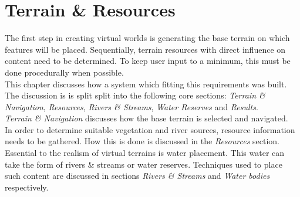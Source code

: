 \chapter{Terrain \& Resources}

The first step in creating virtual worlds is generating the base terrain on which features will be placed. Sequentially, terrain resources with direct influence on content need to be determined. To keep user input to a minimum, this must be done procedurally when possible. \\
This chapter discusses how a system which fitting this requirements was built. The discussion is is split split into the following core sections: \textit{Terrain \& Navigation}, \textit{Resources}, \textit{Rivers \& Streams}, \textit{Water Reserves} and \textit{Results}.\\
\textit{Terrain \& Navigation} discusses how the base terrain is selected and navigated. \\
In order to determine suitable vegetation and river sources, resource information needs to be gathered. How this is done is discussed in the \textit{Resources} section.\\
Essential to the realism of virtual terrains is water placement. This water can take the form of rivers \& streams or water reserves. Techniques used to place such content are discussed in sections \textit{Rivers \& Streams} and \textit{Water bodies} respectively. \\

